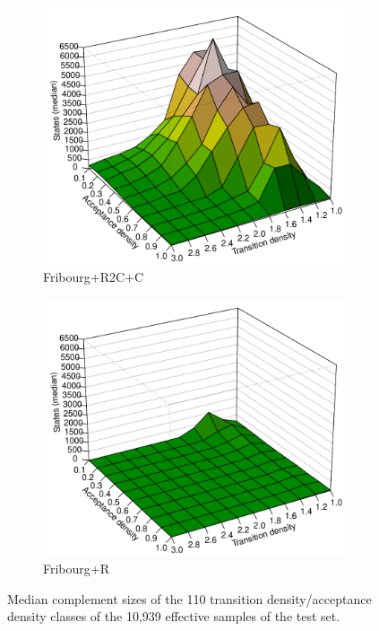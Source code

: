 \begin{figure}[ht]
  \hfill
  \begin{subfigure}[t]{\perspwidth\textwidth}
  \centering
  \includegraphics[width=\textwidth]{figures/r/internal/goal/s.median.Fribourg+R2C+C.pdf}
  \caption{Fribourg+R2C+C}
  \end{subfigure}
  \hfill
  \begin{subfigure}[t]{\perspwidth\textwidth}
  \centering
  \includegraphics[width=\textwidth]{figures/r/internal/goal/s.median.Fribourg+R.pdf}
  \caption{Fribourg+R}
  \end{subfigure}
  \hfill  
\caption{Median complement sizes of the 110 transition density/acceptance density classes of the 10,939 effective samples of the \goal{} test set.}
\label{i.g.persp_1}
\end{figure}

